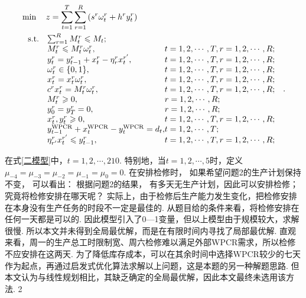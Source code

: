 \begin{equation}\label{二模型}
	\begin{aligned}
&\min \quad z  = \sum_{t  = 1}^{T} \sum_{r = 1}^{R}\left(s^{r} \omega_{t}^{r}+h^{r} y_{t}^{r}\right)\\
& \ \begin{array}{r@{\quad}l@{}l@{\quad}l}
\mathrm{s.t. } 	&\sum_{r=1}^{R} M_{t}^{r} \leqslant M_{t}; &\\
&M_{t}^{r} \leqslant M_{t}^{r} \omega_{t}^{r}, &t=1,2, \cdots, T, r=1,2, \cdots, R;\\
& y_{t}^{r}=y_{t-1}^{r}+x_{t}^{r}-\eta_{r}^{r} x_{t}^{r^{\prime}}, &t=1,2, \cdots, T,  r=1,2, \cdots, R; \\
&\omega_{t}^{r} \in\{0,1\}, &t=1,2, \cdots, T, r=1,2, \cdots, R; \\
&x_{t}^{r}=x_{t}^{r} \omega_{t}^{r},&t=1,2, \cdots, T, r=1,2, \cdots, R;\\
&c^{r} x_{t}^{r}=M_{t}^{r} \omega_{t}^{r}, &t=1,2, \cdots, T, r=1,2, \cdots, R; \\
&M_{t}^{r} \geqslant 0,& r=1,2, \cdots, R ;\\
&y_{0}^{r}=y_{T}^{r}=0,& r=1,2, \cdots, R ;\\
&x_{t}^{r}, y_{t}^{r} \geqslant 0, &t=1,2, \cdots, T, r=1,2, \cdots, R;\\
&y_{t-1}^{\mathrm{WPCR}}+x_{t}^{\mathrm{WPCR}}-y_{t}^{\mathrm{WPCR}}=d_{t}, & t=1,2, \cdots, T; \\
&\eta_{r^{\prime}}^{r} x_{t}^{r^{\prime}} \leqslant y_{t-1}^{r}, &t=1,2, \cdots, T, r=1,2, \cdots, R;
\end{array}.
\end{aligned}
\end{equation}

在式\ref{二模型}中，$t = 1, 2,\cdots, 210.$ 特别地，当$t = 1, 2,\cdots, 5$时，定义$\mu_{-4}=\mu_{-3}=\mu_{-2}=\mu_{-1}=\mu_{0}=0$.
在安排检修时， 如果希望问题2的生产计划保持不变， 可以看出： 根据问题2的结果， 有多天无生产计划，因此可以安排检修；究竟将检修安排在哪天呢？
实际上，由于检修后生产能力发生变化，把检修安排在本身没有生产任务的时段不一定是最佳的.
从题目给的条件来看，将检修安排在任何一天都是可以的. 因此模型引入了0—1变量，但以上模型由于规模较大，求解很慢.
所以本文并未得到全局最优解，而是在有限时间内寻找了局部最优解.
直观来看，周一的生产总工时限制宽、周六检修难以满足外部WPCR需求，所以检修不应安排在这两天.
为了降低库存成本，可以在其余时间中选择WPCR较少的七天作为起点，再通过启发式优化算法求解以上问题，这是本题的另一种解题思路.
但本文认为与线性规划相比，其缺乏确定的全局最优解，因此本文最终未选用该方法.
2
